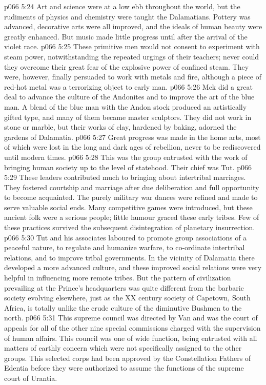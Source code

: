 \vs p066 5:24 Art and science were at a low ebb throughout the world, but the rudiments of physics and chemistry were taught the Dalamatians. Pottery was advanced, decorative arts were all improved, and the ideals of human beauty were greatly enhanced. But music made little progress until after the arrival of the violet race.
\vs p066 5:25 These primitive men would not consent to experiment with steam power, notwithstanding the repeated urgings of their teachers; never could they overcome their great fear of the explosive power of confined steam. They were, however, finally persuaded to work with metals and fire, although a piece of red\hyp{}hot metal was a terrorizing object to early man.
\vs p066 5:26 Mek did a great deal to advance the culture of the Andonites and to improve the art of the blue man. A blend of the blue man with the Andon stock produced an artistically gifted type, and many of them became master sculptors. They did not work in stone or marble, but their works of clay, hardened by baking, adorned the gardens of Dalamatia.
\vs p066 5:27 Great progress was made in the home arts, most of which were lost in the long and dark ages of rebellion, never to be rediscovered until modern times.
\vs p066 5:28 \bibnobreakspace {} This was the group entrusted with the work of bringing human society up to the level of statehood. Their chief was Tut.
\vs p066 5:29 These leaders contributed much to bringing about intertribal marriages. They fostered courtship and marriage after due deliberation and full opportunity to become acquainted. The purely military war dances were refined and made to serve valuable social ends. Many competitive games were introduced, but these ancient folk were a serious people; little humour graced these early tribes. Few of these practices survived the subsequent disintegration of planetary insurrection.
\vs p066 5:30 Tut and his associates laboured to promote group associations of a peaceful nature, to regulate and humanize warfare, to co\hyp{}ordinate intertribal relations, and to improve tribal governments. In the vicinity of Dalamatia there developed a more advanced culture, and these improved social relations were very helpful in influencing more remote tribes. But the pattern of civilization prevailing at the Prince’s headquarters was quite different from the barbaric society evolving elsewhere, just as the XX century society of Capetown, South Africa, is totally unlike the crude culture of the diminutive Bushmen to the north.
\vs p066 5:31 \bibnobreakspace {} This supreme council was directed by Van and was the court of appeals for all of the other nine special commissions charged with the supervision of human affairs. This council was one of wide function, being entrusted with all matters of earthly concern which were not specifically assigned to the other groups. This selected corps had been approved by the Constellation Fathers of Edentia before they were authorized to assume the functions of the supreme court of Urantia.
